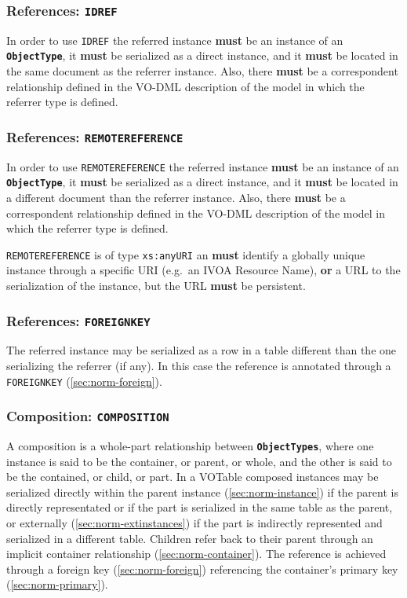 \documentclass[11pt,a4paper]{ivoa}
\begin{document}
\subsubsection{References: \texttt{IDREF}}\label{sec:norm-idref}

In order to use \texttt{IDREF} the referred instance \textbf{must} be an
instance of an \textbf{\texttt{ObjectType}}, it \textbf{must} be
serialized as a direct instance, and it \textbf{must} be located in the
same document as the referrer instance. Also, there \textbf{must} be a
correspondent relationship defined in the VO-DML description of the
model in which the referrer type is defined.

\subsubsection{References:
\texttt{REMOTEREFERENCE}}\label{sec:norm-remote-reference}

In order to use \texttt{REMOTEREFERENCE} the referred instance
\textbf{must} be an instance of an \textbf{\texttt{ObjectType}}, it
\textbf{must} be serialized as a direct instance, and it \textbf{must}
be located in a different document than the referrer instance. Also,
there \textbf{must} be a correspondent relationship defined in the
VO-DML description of the model in which the referrer type is defined.

\texttt{REMOTEREFERENCE} is of type \texttt{xs:anyURI} an \textbf{must}
identify a globally unique instance through a specific URI (e.g.~an IVOA
Resource Name), \textbf{or} a URL to the serialization of the instance,
but the URL \textbf{must} be persistent.

\subsubsection{References:
\texttt{FOREIGNKEY}}\label{sec:norm-reference-foreignkey}

The referred instance may be serialized as a row in a table different
than the one serializing the referrer (if any). In this case the
reference is annotated through a \texttt{FOREIGNKEY}
(\ref{sec:norm-foreign}).

\subsubsection{Composition:
\texttt{COMPOSITION}}\label{sec:norm-composition}

A composition is a whole-part relationship between
\textbf{\texttt{ObjectTypes}}, where one instance is said to be the
container, or parent, or whole, and the other is said to be the
contained, or child, or part. In a VOTable composed instances may be
serialized directly within the parent instance
(\ref{sec:norm-instance}) if the parent is directly representated or if
the part is serialized in the same table as the parent, or externally
(\ref{sec:norm-extinstances}) if the part is indirectly represented and
serialized in a different table. Children refer back to their parent
through an implicit container relationship (\ref{sec:norm-container}).
The reference is achieved through a foreign key
(\ref{sec:norm-foreign}) referencing the container's primary key
(\ref{sec:norm-primary}).
\end{document}
